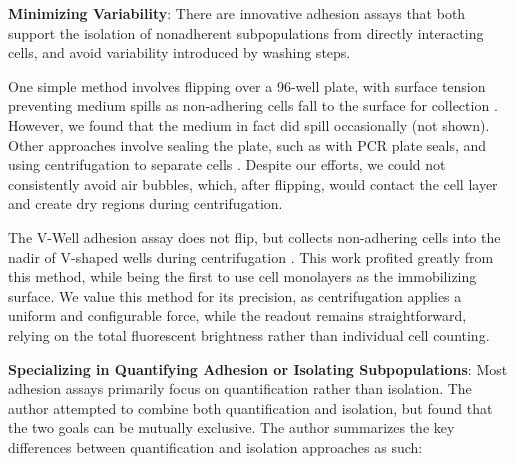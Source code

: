 \textbf{Minimizing Variability}:
There are innovative adhesion assays that both
support the isolation of nonadherent subpopulations from directly interacting
cells, and avoid variability introduced by washing steps.

One simple method involves flipping over a 96-well plate, with surface tension
preventing medium spills as non-adhering cells fall to the surface for
collection \cite{zepeda-morenoInnovativeMethodQuantification2011}. However, we
found that the medium in fact did spill occasionally (not shown). Other
approaches involve sealing the plate, such as with PCR plate seals, and using
centrifugation to separate cells \cite{reyesCentrifugationCellAdhesion2003,
      chenHighThroughputScreeningTest2021}. Despite our efforts, we could not
consistently avoid air bubbles, which, after flipping, would contact the cell
layer and create dry regions during centrifugation.

The V-Well adhesion assay does not flip, but collects non-adhering cells into
the nadir of V-shaped wells during centrifugation
\cite{weetallHomogeneousFluorometricAssay2001}. This work profited greatly from
this method, while  being the first to use cell
monolayers as the immobilizing surface. We value this method for its precision,
as centrifugation applies a uniform and configurable force, while the readout
remains straightforward, relying on the total fluorescent brightness rather than
individual cell counting.




\textbf{Specializing in Quantifying Adhesion or Isolating Subpopulations}: Most
adhesion assays primarily focus on quantification rather than isolation. The
author attempted to combine both quantification and isolation, but found that
the two goals can be mutually exclusive. The author summarizes the key
differences between quantification and isolation approaches as such:

